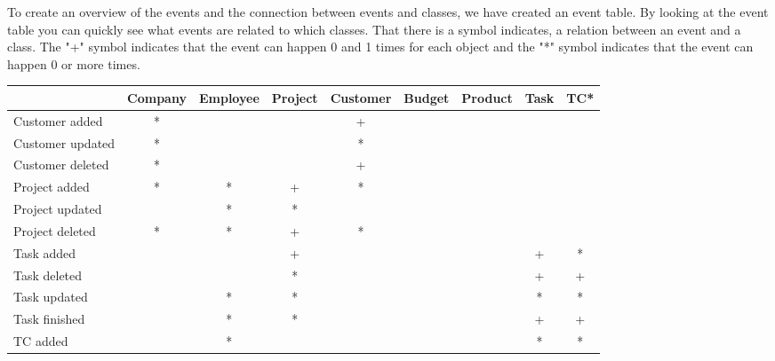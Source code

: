 To create an overview of the events and the connection between events and classes, we have created an event table. By looking at the event table you can quickly see what events are related to which classes.
That there is a symbol indicates, a relation between an event and a class. The "+" symbol indicates that the event can happen 0 and 1 times for each object and the "*" symbol indicates that the event can happen 0 or more times.


\hspace*{-2,5cm}
\begin{tabular}{|l||c|c|c|c|c|c|c|c|}
  \hline
                                   & Company & Employee & Project & Customer & Budget  & Product & Task    & TC*             \\\hline \hline
   Customer added                  &    *    &          &         &     +    &         &         &         &                 \\\hline
   Customer updated                &    *    &          &         &     *    &         &         &         &                 \\\hline 
   Customer deleted                &    *    &          &         &     +    &         &         &         &                 \\\hline
   Project added                   &    *    &    *     &    +    &     *    &         &         &         &                 \\\hline
   Project updated                 &         &    *     &    *    &          &         &         &         &                 \\\hline
   Project deleted                 &    *    &    *     &    +    &     *    &         &         &         &                 \\\hline
   Task added                      &         &          &    +    &          &         &         &   +     &   *             \\\hline 
   Task deleted                    &         &          &    *    &          &         &         &   +     &   +             \\\hline
   Task updated                    &         &    *     &    *    &          &         &         &   *     &   *             \\\hline
   Task finished                   &         &    *     &    *    &          &         &         &   +     &   +             \\\hline
   TC added                        &         &    *     &         &          &         &         &   *     &   *             \\\hline

\end{tabular}
